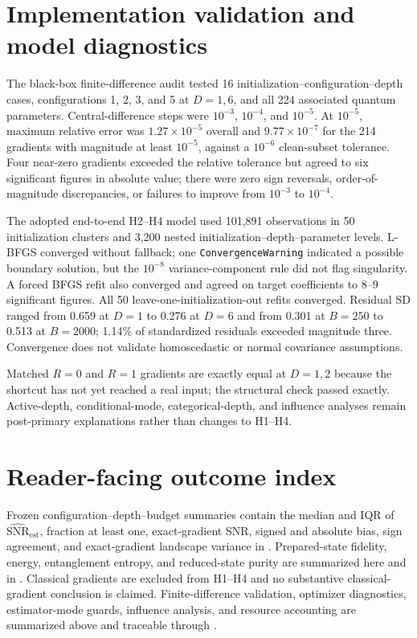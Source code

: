 \documentclass[pdflatex,sn-basic,Numbered]{sn-jnl}
\begin{document}
\section{Implementation validation and model diagnostics}

The black-box finite-difference audit tested 16 initialization--configuration--depth cases, configurations 1, 2, 3, and 5 at $D=1,6$, and all 224 associated quantum parameters. Central-difference steps were $10^{-3}$, $10^{-4}$, and $10^{-5}$. At $10^{-5}$, maximum relative error was $1.27\times10^{-5}$ overall and $9.77\times10^{-7}$ for the 214 gradients with magnitude at least $10^{-5}$, against a $10^{-6}$ clean-subset tolerance. Four near-zero gradients exceeded the relative tolerance but agreed to six significant figures in absolute value; there were zero sign reversals, order-of-magnitude discrepancies, or failures to improve from $10^{-3}$ to $10^{-4}$.

The adopted end-to-end H2--H4 model used 101,891 observations in 50 initialization clusters and 3,200 nested initialization--depth--parameter levels. L-BFGS converged without fallback; one \texttt{ConvergenceWarning} indicated a possible boundary solution, but the $10^{-8}$ variance-component rule did not flag singularity. A forced BFGS refit also converged and agreed on target coefficients to 8--9 significant figures. All 50 leave-one-initialization-out refits converged. Residual SD ranged from 0.659 at $D=1$ to 0.276 at $D=6$ and from 0.301 at $B=250$ to 0.513 at $B=2000$; 1.14\% of standardized residuals exceeded magnitude three. Convergence does not validate homoscedastic or normal covariance assumptions.

Matched $R=0$ and $R=1$ gradients are exactly equal at $D=1,2$ because the shortcut has not yet reached a real input; the structural check passed exactly. Active-depth, conditional-mode, categorical-depth, and influence analyses remain post-primary explanations rather than changes to H1--H4.

\section{Reader-facing outcome index}

Frozen configuration--depth--budget summaries contain the median and IQR of $\widehat{\mathrm{SNR}}_{\mathrm{est}}$, fraction at least one, exact-gradient SNR, signed and absolute bias, sign agreement, and exact-gradient landscape variance in . Prepared-state fidelity, energy, entanglement entropy, and reduced-state purity are summarized here and in . Classical gradients are excluded from H1--H4 and no substantive classical-gradient conclusion is claimed. Finite-difference validation, optimizer diagnostics, estimator-mode guards, influence analysis, and resource accounting are summarized above and traceable through .
\end{document}
